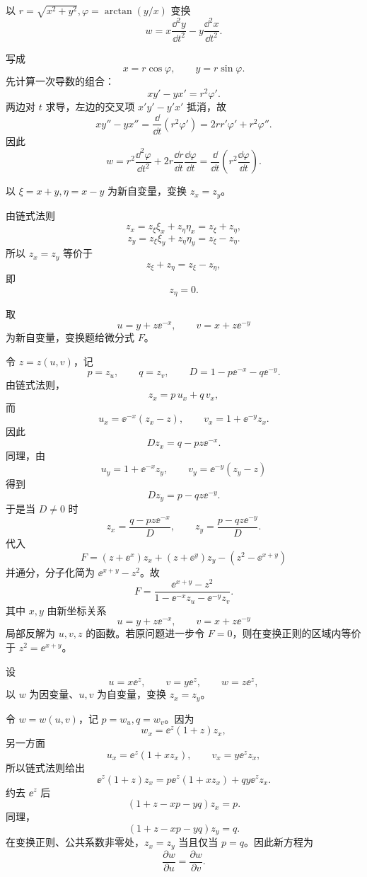 \begin{xexercise}[20.3.3 练习题 2]
以 $r=\sqrt{x^2+y^2},\varphi=\arctan(y/x)$ 变换
\[
  w=x\frac{\dd^2y}{\dd t^2}-y\frac{\dd^2x}{\dd t^2}.
\]
\end{xexercise}
\begin{xsolution}
写成
\[
  x=r\cos\varphi,
  \qquad
  y=r\sin\varphi.
\]
先计算一次导数的组合：
\[
  xy'-yx'
  =r^2\varphi'.
\]
两边对 $t$ 求导，左边的交叉项 $x'y'-y'x'$ 抵消，故
\[
  xy''-yx''=\frac{\dd}{\dd t}(r^2\varphi')
  =2rr'\varphi'+r^2\varphi''.
\]
因此
\[
  \boxed{\displaystyle
    w=r^2\frac{\dd^2\varphi}{\dd t^2}
      +2r\frac{\dd r}{\dd t}\frac{\dd\varphi}{\dd t}}
  =\boxed{\displaystyle
    \frac{\dd}{\dd t}\left(r^2\frac{\dd\varphi}{\dd t}\right)}.
\]
\end{xsolution}

\begin{xexercise}[20.3.3 练习题 3]
以 $\xi=x+y,\eta=x-y$ 为新自变量，变换 $z_x=z_y$。
\end{xexercise}
\begin{xsolution}
由链式法则
\[
  z_x=z_\xi\xi_x+z_\eta\eta_x=z_\xi+z_\eta,
\]
\[
  z_y=z_\xi\xi_y+z_\eta\eta_y=z_\xi-z_\eta.
\]
所以 $z_x=z_y$ 等价于
\[
  z_\xi+z_\eta=z_\xi-z_\eta,
\]
即
\[
  \boxed{z_\eta=0}.
\]
\end{xsolution}

\begin{xexercise}[20.3.3 练习题 4]
取
\[
  u=y+z\ee^{-x},\qquad v=x+z\ee^{-y}
\]
为新自变量，变换题给微分式 $F$。
\end{xexercise}
\begin{xsolution}
令 $z=z(u,v)$，记
\[
  p=z_u,
  \qquad q=z_v,
  \qquad
  D=1-p\ee^{-x}-q\ee^{-y}.
\]
由链式法则，
\[
  z_x=p\,u_x+q\,v_x,
\]
而
\[
  u_x=\ee^{-x}(z_x-z),
  \qquad
  v_x=1+\ee^{-y}z_x.
\]
因此
\[
  Dz_x=q-pz\ee^{-x}.
\]
同理，由
\[
  u_y=1+\ee^{-x}z_y,
  \qquad
  v_y=\ee^{-y}(z_y-z)
\]
得到
\[
  Dz_y=p-qz\ee^{-y}.
\]
于是当 $D\ne0$ 时
\[
  z_x=\frac{q-pz\ee^{-x}}D,
  \qquad
  z_y=\frac{p-qz\ee^{-y}}D.
\]
代入
\[
  F=(z+\ee^x)z_x+(z+\ee^y)z_y-(z^2-\ee^{x+y})
\]
并通分，分子化简为 $\ee^{x+y}-z^2$。故
\[
  \boxed{\displaystyle
    F=\frac{\ee^{x+y}-z^2}
    {1-\ee^{-x}z_u-\ee^{-y}z_v}}.
\]
其中 $x,y$ 由新坐标关系
\[
  u=y+z\ee^{-x},\qquad v=x+z\ee^{-y}
\]
局部反解为 $u,v,z$ 的函数。若原问题进一步令 $F=0$，则在变换正则的区域内等价于 $z^2=\ee^{x+y}$。
\end{xsolution}

\begin{xexercise}[20.3.3 练习题 5]
设
\[
  u=x\ee^z,\qquad v=y\ee^z,\qquad w=z\ee^z,
\]
以 $w$ 为因变量、$u,v$ 为自变量，变换 $z_x=z_y$。
\end{xexercise}
\begin{xsolution}
令 $w=w(u,v)$，记 $p=w_u,q=w_v$。因为
\[
  w_x=\ee^z(1+z)z_x,
\]
另一方面
\[
  u_x=\ee^z(1+xz_x),
  \qquad
  v_x=y\ee^z z_x,
\]
所以链式法则给出
\[
  \ee^z(1+z)z_x
  =p\ee^z(1+xz_x)+qy\ee^z z_x.
\]
约去 $\ee^z$ 后
\[
  (1+z-xp-yq)z_x=p.
\]
同理，
\[
  (1+z-xp-yq)z_y=q.
\]
在变换正则、公共系数非零处，$z_x=z_y$ 当且仅当 $p=q$。因此新方程为
\[
  \boxed{\displaystyle \frac{\partial w}{\partial u}
  =\frac{\partial w}{\partial v}}.
\]
\end{xsolution}

